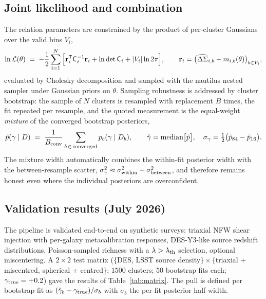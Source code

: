 \documentclass[11pt,a4paper]{article}
\newcommand{\DSigma}{\Delta\Sigma}
\begin{document}
\subsection{Joint likelihood and combination}

The relation parameters are constrained by the product of per-cluster
Gaussians over the valid bins $V_i$,
\begin{equation}
\ln \mathcal{L}(\theta) \;=\;
-\frac{1}{2}\sum_{i=1}^{N}
\Big[
\mathbf{r}_i^{\sf T} \mathsf{C}_i^{-1} \mathbf{r}_i
+ \ln\det \mathsf{C}_i
+ |V_i| \ln 2\pi
\Big],
\qquad
\mathbf{r}_i = \big(\widehat{\DSigma}_{i,b} - m_{i,b}(\theta)\big)_{b\in V_i},
\label{eq:jointlike}
\end{equation}
evaluated by Cholesky decomposition and sampled with the nautilus nested
sampler \cite{nautilus} under Gaussian priors on $\theta$. Sampling
robustness is addressed by cluster bootstrap: the sample of $N$ clusters is
resampled with replacement $B$ times, the fit repeated per resample, and
the quoted measurement is the equal-weight \emph{mixture} of the converged
bootstrap posteriors,
\begin{equation}
\tilde p(\gamma \mid D) \;=\;
\frac{1}{B_{\rm conv}} \sum_{b\,\in\,{\rm converged}} p_b(\gamma \mid D_b),
\qquad
\hat\gamma = \mathrm{median}\big[\tilde p\big],\quad
\sigma_\gamma = \tfrac{1}{2}\big(\tilde p_{84} - \tilde p_{16}\big).
\label{eq:mixture}
\end{equation}
The mixture width automatically combines the within-fit posterior width
with the between-resample scatter,
$\sigma_\gamma^2 \approx \sigma_{\rm within}^2 + \sigma_{\rm between}^2$,
and therefore remains honest even where the individual posteriors are
overconfident.

\subsection{Validation results (July 2026)}
\label{sec:validation}

The pipeline is validated end-to-end on synthetic surveys: triaxial NFW
shear injection with per-galaxy metacalibration responses, DES-Y3-like
source redshift distributions, Poisson-sampled richness with a
$\lambda > \lambda_{\rm th}$ selection, optional miscentering. A
$2\times2$ test matrix ($\{$DES, LSST source density$\}\times\{$triaxial +
miscentred, spherical + centred$\}$; $1500$ clusters; $50$ bootstrap fits
each; $\gamma_{\rm true}=+0.2$) gave the results of
Table~\ref{tab:matrix}. The pull is defined per bootstrap fit as
$(\hat\gamma_b - \gamma_{\rm true})/\sigma_b$ with $\sigma_b$ the per-fit
posterior half-width.
\end{document}
